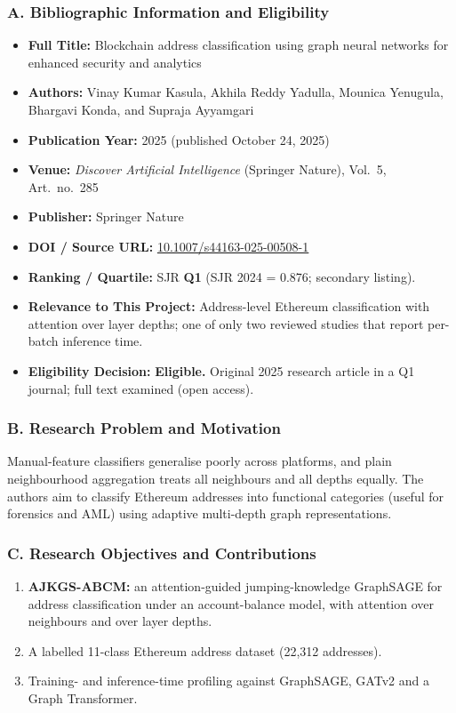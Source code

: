\documentclass[11pt,a4paper]{article}
\begin{document}
\subsubsection*{A. Bibliographic Information and Eligibility}
\begin{itemize}[leftmargin=*]
    \item \textbf{Full Title:} Blockchain address classification using graph neural networks for enhanced security and analytics
    \item \textbf{Authors:} Vinay Kumar Kasula, Akhila Reddy Yadulla, Mounica Yenugula, Bhargavi Konda, and Supraja Ayyamgari
    \item \textbf{Publication Year:} 2025 (published October 24, 2025)
    \item \textbf{Venue:} \textit{Discover Artificial Intelligence} (Springer Nature), Vol.~5, Art.\ no.\ 285
    \item \textbf{Publisher:} Springer Nature
    \item \textbf{DOI / Source URL:} \href{https://doi.org/10.1007/s44163-025-00508-1}{10.1007/s44163-025-00508-1}
    \item \textbf{Ranking / Quartile:} SJR \textbf{Q1} (SJR 2024 = 0.876; secondary listing).
    \item \textbf{Relevance to This Project:} Address-level Ethereum classification with attention over layer depths; one of only two reviewed studies that report per-batch inference time.
    \item \textbf{Eligibility Decision:} \textbf{Eligible.} Original 2025 research article in a Q1 journal; full text examined (open access).
\end{itemize}

\subsubsection*{B. Research Problem and Motivation}
Manual-feature classifiers generalise poorly across platforms, and plain neighbourhood aggregation treats all neighbours and all depths equally. The authors aim to classify Ethereum addresses into functional categories (useful for forensics and AML) using adaptive multi-depth graph representations.

\subsubsection*{C. Research Objectives and Contributions}
\begin{enumerate}[leftmargin=*]
    \item \textbf{AJKGS-ABCM:} an attention-guided jumping-knowledge GraphSAGE for address classification under an account-balance model, with attention over neighbours and over layer depths.
    \item A labelled 11-class Ethereum address dataset (22,312 addresses).
    \item Training- and inference-time profiling against GraphSAGE, GATv2 and a Graph Transformer.
\end{enumerate}
\end{document}
